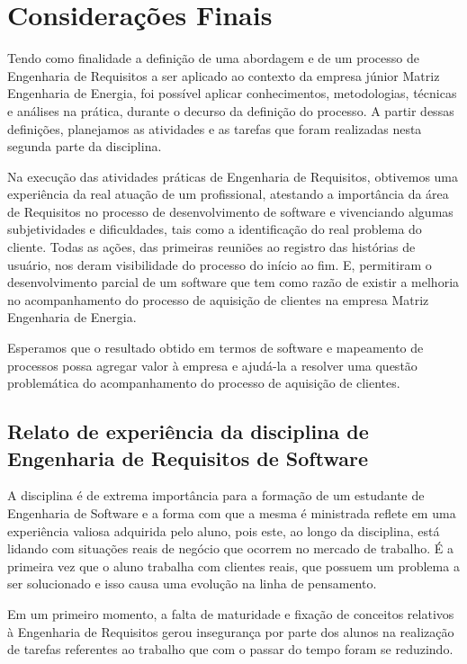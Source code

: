 \chapter[Considerações Finais]{Considerações Finais}
Tendo como finalidade a definição de uma abordagem e de um processo de Engenharia de Requisitos a ser aplicado ao contexto da empresa júnior Matriz Engenharia de Energia, foi possível aplicar conhecimentos, metodologias, técnicas e análises na prática, durante o decurso da definição do processo. A partir dessas definições, planejamos as atividades e as tarefas que foram realizadas nesta segunda parte da disciplina.

Na execução das atividades práticas de Engenharia de Requisitos, obtivemos uma experiência da real atuação de um profissional, atestando a importância da área de Requisitos no processo de desenvolvimento de software e vivenciando algumas subjetividades e dificuldades, tais como a identificação do real problema do cliente. Todas as ações, das primeiras reuniões ao registro das histórias de usuário, nos deram visibilidade do processo do início ao fim. E, permitiram o desenvolvimento parcial de um software que tem como razão de existir a melhoria no acompanhamento do processo de aquisição de clientes na empresa Matriz Engenharia de Energia.

Esperamos que o resultado obtido em termos de software e mapeamento de processos possa agregar valor à empresa e ajudá-la a resolver uma questão problemática do acompanhamento do processo de aquisição de clientes.

\section{Relato de experiência da disciplina de Engenharia de Requisitos de Software}

\indent A disciplina é de extrema importância para a formação de um estudante de Engenharia de Software e a 
forma com que a mesma é ministrada reflete em uma experiência valiosa adquirida pelo aluno, pois este, ao longo
da disciplina, está lidando com situações reais de negócio que ocorrem no mercado de trabalho. É a primeira vez 
que o aluno trabalha com clientes reais, que possuem um problema a ser solucionado e isso causa uma evolução na 
linha de pensamento.

\indent Em um primeiro momento, a falta de maturidade e fixação de conceitos relativos à Engenharia de Requisitos 
gerou insegurança por parte dos alunos na realização de tarefas referentes ao trabalho que com o passar do tempo 
foram se reduzindo.

